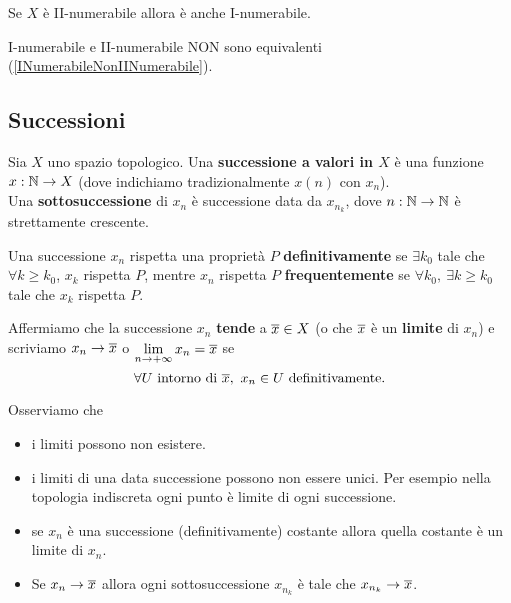 \begin{multicols*}{2}
\begin{proposition}\label{IINumerabileImplicaINumerabile}
Se $X$ è II-numerabile allora è anche I-numerabile.
\end{proposition}

\begin{remark}
I-numerabile e II-numerabile NON sono equivalenti (\ref{INumerabileNonIINumerabile}).
\end{remark}

\subsection{Successioni}
\begin{definition}[Successione]
Sia $X$ uno spazio topologico. Una \textbf{successione a valori in $X$} è una funzione $x:\mathbb{N}\to X$ (dove indichiamo tradizionalmente $x(n)$ con $x_n$).\\
Una \textbf{sottosuccessione} di $x_n$ è successione data da $x_{n_k}$, dove $n:\mathbb{N}\to \mathbb{N}$ è strettamente crescente.
\end{definition}
\begin{definition}
Una successione $x_n$ rispetta una proprietà $P$ \textbf{definitivamente} se $\exists k_0$ tale che $\forall k\geq k_0$, $x_k$ rispetta $P$, mentre $x_n$ rispetta $P$ \textbf{frequentemente} se $\forall k_0,\ \exists k\geq k_0$ tale che $x_k$ rispetta $P$.
\end{definition}
\begin{definition}[Limite]
Affermiamo che la successione $x_n$ \textbf{tende} a $\overline{x}\in X$ (o che $\overline{x}$ è un \textbf{limite} di $x_n$) e scriviamo $x_n\to\overline{x}$ o $\displaystyle \lim_{n\to+\infty}x_n=\overline{x}$ se
\[\forall U\text{ intorno di }\ol x,\ x_n\in U\ \text{definitivamente}.\]
\end{definition}
\begin{remark}
Osserviamo che
\begin{itemize}[noitemsep]
\item i limiti possono non esistere.
\item i limiti di una data successione possono non essere unici. Per esempio nella topologia indiscreta ogni punto è limite di ogni successione.
\item se $x_n$ è una successione (definitivamente) costante allora quella costante è un limite di $x_n$.
\item Se $x_n\to\overline{x}$ allora ogni sottosuccessione $x_{n_k}$ è tale che $x_{n_k}\to \overline{x}$.
\end{itemize}
\end{remark}


\end{multicols*}
